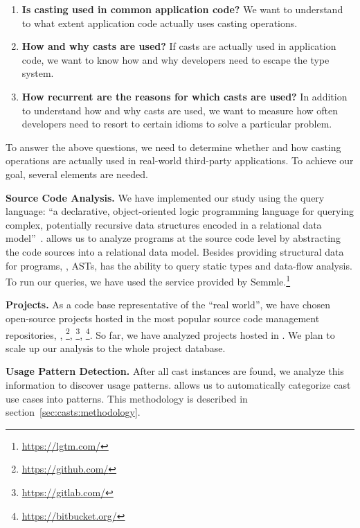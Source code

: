 \begin{enumerate}[label=$CRQ\arabic*:$,ref=$CRQ\arabic*$,leftmargin=3.4\parindent]
\item\label{enum:rq1}{\bf Is casting used in common application code?}
We want to understand to what extent application code actually uses casting operations.
\item\label{enum:rq2}{\bf How and why casts are used?}
If casts are actually used in application code, we want to know how and why developers need to escape the type system.
\item\label{enum:rq3}{\bf How recurrent are the reasons for which casts are used?}
In addition to understand how and why casts are used, we want to measure how often developers need to resort to certain idioms to solve a particular problem.
\end{enumerate}

To answer the above questions, we need to determine whether and how casting operations are actually used in real-world third-party \java{} applications.
To achieve our goal, several elements are needed.

\textbf{Source Code Analysis.}
We have implemented our study using the \ql{} query language:
``a declarative, object-oriented logic programming language for querying complex, potentially recursive data structures encoded in a relational data model''~\cite{avgustinovQLObjectorientedQueries2016}.
\ql{} allows us to analyze programs at the source code level by abstracting the code sources into a relational data model.
Besides providing structural data for programs, \ie{}, ASTs, \ql{} has the ability to query static types and data-flow analysis.
To run our \ql{} queries, we have used the service provided by Semmle.\footnote{\url{https://lgtm.com/}} 

\textbf{Projects.} 
As a code base representative of the ``real world'',
we have chosen open-source projects hosted in the most popular source code management repositories, \ie{},
\github{}\footnote{\url{https://github.com/}},
\gitlab{}\footnote{\url{https://gitlab.com/}},
\bitbucket{}\footnote{\url{https://bitbucket.org/}}.
So far, we have analyzed \nproject{} \java{} projects hosted in \lgtm{}.
We plan to scale up our analysis to the whole \lgtm{} project database.

\textbf{Usage Pattern Detection.}
After all cast instances are found, we analyze this information to discover usage patterns.
\ql{} allows us to automatically categorize cast use cases into patterns.
This methodology is described in section~\ref{sec:casts:methodology}.

